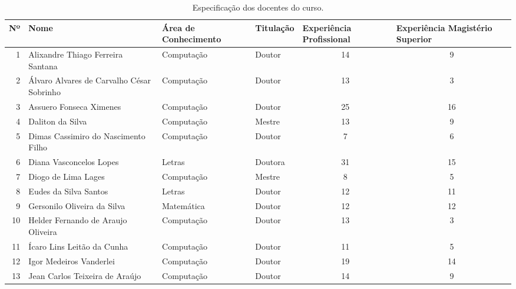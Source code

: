 \documentclass[
	12pt,				%
	openright,			%
  oneside,     %
	a4paper,			%
 hyphens,
	chapter=TITLE,		%
	english,			%
	french,				%
	spanish,			%
	brazil				%
	]{abntex2}
\begin{document}
\begin{center}
  
  \begin{scriptsize}
    \begin{longtable}{rp{6cm}p{1.8cm}p{1.4cm}p{1.9cm}p{1.8cm}}
      \caption{\label{quadro:especificacao-dos-docentes-curso}Especificação dos docentes do curso.}\\
    \toprule
    \textbf{Nº} & \textbf{Nome} & \textbf{Área de Conhecimento} & \textbf{Titulação} & \textbf{Experiência Profissional} & \textbf{Experiência Magistério Superior}\\ 
    \midrule
    1 & Alixandre Thiago Ferreira Santana & Computação & Doutor & \multicolumn{1}{c}{14} & \multicolumn{1}{c}{9}\\ \midrule
    2 & Álvaro Alvares de Carvalho César Sobrinho & Computação & Doutor & \multicolumn{1}{c}{13} & \multicolumn{1}{c}{3} \\ \midrule
    3 & Assuero Fonseca Ximenes & Computação & Doutor & \multicolumn{1}{c}{25} & \multicolumn{1}{c}{16}\\ \midrule
    4 & Daliton da Silva & Computação & Mestre & \multicolumn{1}{c}{13} & \multicolumn{1}{c}{9} \\ \midrule
    5 & Dimas Cassimiro do Nascimento Filho & Computação & Doutor & \multicolumn{1}{c}{7} & \multicolumn{1}{c}{6} \\ \midrule
    6 & Diana Vasconcelos Lopes  & Letras & Doutora & \multicolumn{1}{c}{31} & \multicolumn{1}{c}{15} \\ \midrule
    7 & Diogo de Lima Lages & Computação & Mestre & \multicolumn{1}{c}{8} & \multicolumn{1}{c}{5} \\ \midrule
    8 & Eudes da Silva Santos & Letras & Doutor & \multicolumn{1}{c}{12} & \multicolumn{1}{c}{11}\\ \midrule
    9 & Gersonilo Oliveira da Silva & Matemática & Doutor & \multicolumn{1}{c}{12} & \multicolumn{1}{c}{12}\\ \midrule
    10 & Helder Fernando de Araujo Oliveira & Computação & Doutor & \multicolumn{1}{c}{13} & \multicolumn{1}{c}{3}\\ \midrule
    11 & Ícaro Lins Leitão da Cunha & Computação & Doutor & \multicolumn{1}{c}{11} & \multicolumn{1}{c}{5}\\ \midrule
    12 & Igor Medeiros Vanderlei & Computação & Doutor & \multicolumn{1}{c}{19} & \multicolumn{1}{c}{14}\\ \midrule
    13 & Jean Carlos Teixeira de Araújo & Computação & Doutor & \multicolumn{1}{c}{14} & \multicolumn{1}{c}{9}\\ \midrule

\end{longtable}
\end{scriptsize}
\end{center}
\end{document}
